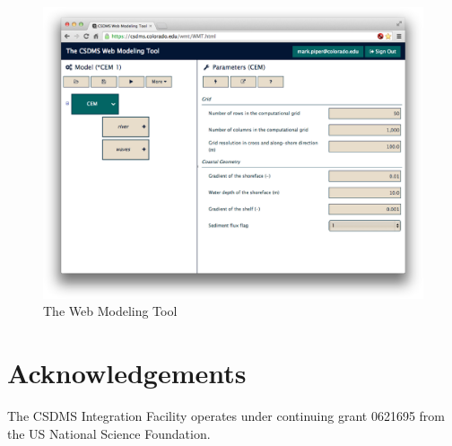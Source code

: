 \documentclass[11pt, oneside]{amsart}
\begin{document}
\begin{figure}
  \caption{The Web Modeling Tool}
  \begin{center}
    \includegraphics[scale=.25]{wmt.eps}
  \end{center}
  \label{fig:wmt_screenshot}
\end{figure}

\section{Acknowledgements}

The CSDMS Integration Facility operates under continuing grant 0621695 from the
US National Science Foundation.



{}
\end{document}
